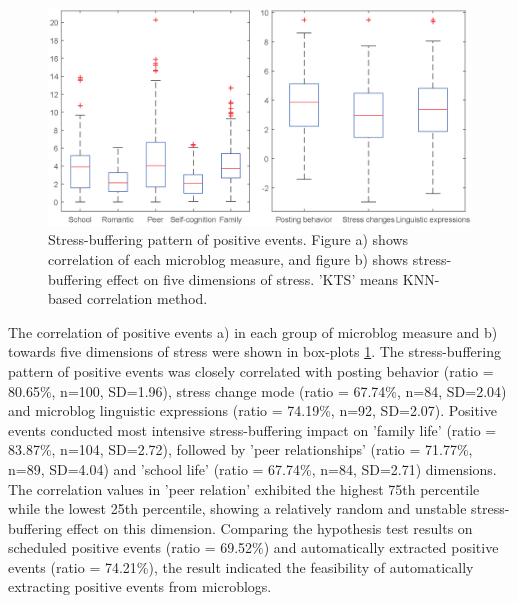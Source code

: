 \begin{figure}
\centering
\includegraphics[width=\linewidth]{figs/boxNew.eps}%
\caption{\small{Stress-buffering pattern of positive events. Figure a) shows correlation of each microblog measure,
and figure b) shows stress-buffering effect on five dimensions of stress. 'KTS' means KNN-based correlation method.}}
\label{fig:correlation}
\end{figure}

The correlation of positive events a) in each group of microblog measure
and b) towards five dimensions of stress
were shown in box-plots \ref{fig:correlation}.
The stress-buffering pattern of positive events
was closely correlated with posting behavior (ratio = 80.65\%, n=100, SD=1.96),
stress change mode (ratio = 67.74\%, n=84, SD=2.04) and microblog linguistic expressions (ratio = 74.19\%, n=92, SD=2.07).
Positive events conducted most intensive stress-buffering impact on 'family life' (ratio = 83.87\%, n=104, SD=2.72),
followed by 'peer relationships' (ratio = 71.77\%, n=89, SD=4.04) and 'school life' (ratio = 67.74\%, n=84, SD=2.71) dimensions.
The correlation values in 'peer relation'
exhibited the highest 75th percentile while the lowest 25th percentile,
showing a relatively random and unstable stress-buffering effect on this dimension.
Comparing the hypothesis test results on scheduled positive events (ratio = 69.52\%)
and automatically extracted positive events (ratio = 74.21\%),
the result indicated the feasibility of automatically extracting positive events from microblogs.

